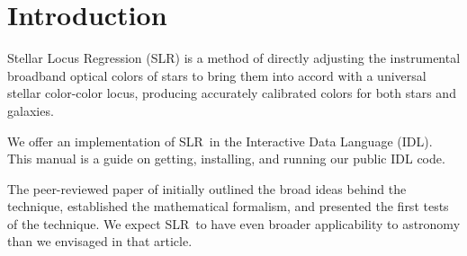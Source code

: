 \documentclass{report}
\newcommand{\slr}{SLR}
\begin{document}





\tableofcontents
{}
\setcounter{page}{1}



\chapter{Introduction}

Stellar Locus Regression (\slr) is a method of directly adjusting the
instrumental broadband optical colors of stars to bring them into
accord with a universal stellar color-color locus, producing
accurately calibrated colors for both stars and galaxies.  

We offer an implementation of \slr\ in the Interactive Data Language
(IDL).  This manual is a guide on getting, installing, and running our
public IDL code.

The peer-reviewed paper of \citet{bib:slr} initially outlined the
broad ideas behind the technique, established the mathematical
formalism, and presented the first tests of the technique.  We expect
\slr\ to have even broader applicability to astronomy than we
envisaged in that article.
\end{document}

